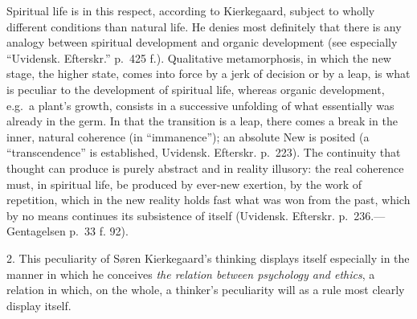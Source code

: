 \documentclass[12pt,a4paper]{book}
\newcommand{\opage}[1]{\marginnote{\footnotesize\textit{[#1]}}}
\begin{document}
Spiritual life is in this respect, according to Kierkegaard, subject to
wholly different conditions than natural life. He denies most definitely
that there is any analogy between spiritual development and organic
development (see especially ``Uvidensk. Efterskr.'' p.~425 f.).
Qualitative metamorphosis, in which the new stage, the higher state, comes
into force by a jerk of decision or by a leap, is what is peculiar to the
development of spiritual life, whereas organic development, e.g.\ a
plant's growth,
\opage{73}consists in a successive unfolding of what essentially was already in
the germ. In that the transition is a leap, there comes a break in the
inner, natural coherence (in ``immanence''); an absolute New is posited
(a ``transcendence'' is established, Uvidensk. Efterskr. p.~223). The
continuity that thought can produce is purely abstract and in reality
illusory: the real coherence must, in spiritual life, be produced by
ever-new exertion, by the work of repetition, which in the new reality
holds fast what was won from the past, which by no means continues its
subsistence of itself (Uvidensk. Efterskr. p.~236.---Gentagelsen
p.~33 f. 92).

2. This peculiarity of Søren Kierkegaard's thinking displays itself
especially in the manner in which he conceives \textit{the relation
between psychology and ethics}, a relation in which, on the whole, a
thinker's peculiarity will as a rule most clearly display itself.
\end{document}
